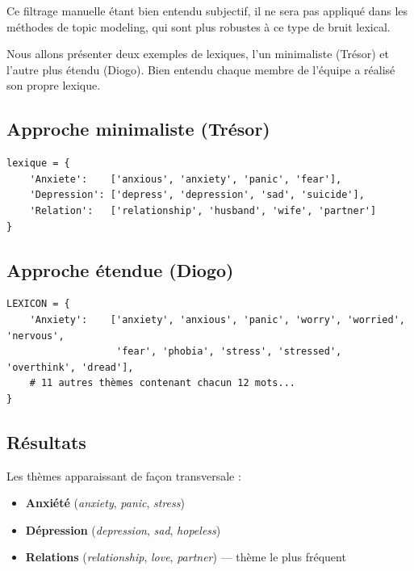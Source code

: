 \documentclass[12pt,a4paper]{report}
\begin{document}
\begin{note}[Remarque]
  Ce filtrage manuelle étant bien entendu subjectif, il ne sera pas appliqué dans les méthodes de topic modeling, qui sont plus robustes à ce type de bruit lexical.
\end{note}

Nous allons présenter deux exemples de lexiques, l'un minimaliste (Trésor) et l'autre plus étendu (Diogo). 
Bien entendu chaque membre de l'équipe a réalisé son propre lexique.

\subsection{Approche minimaliste (Trésor)}

\begin{lstlisting}
lexique = {
    'Anxiete':    ['anxious', 'anxiety', 'panic', 'fear'],
    'Depression': ['depress', 'depression', 'sad', 'suicide'],
    'Relation':   ['relationship', 'husband', 'wife', 'partner']
}
\end{lstlisting}

\subsection{Approche étendue (Diogo)}

\begin{lstlisting}
LEXICON = {
    'Anxiety':    ['anxiety', 'anxious', 'panic', 'worry', 'worried', 'nervous',
                   'fear', 'phobia', 'stress', 'stressed', 'overthink', 'dread'],
    # 11 autres thèmes contenant chacun 12 mots...
}
\end{lstlisting}

\pagebreak

\subsection{Résultats}

Les thèmes apparaissant de façon transversale :
\begin{itemize}
  \item \textbf{Anxiété} (\textit{anxiety}, \textit{panic}, \textit{stress})
  \item \textbf{Dépression} (\textit{depression}, \textit{sad}, \textit{hopeless})
  \item \textbf{Relations} (\textit{relationship}, \textit{love}, \textit{partner}) — thème le plus fréquent
\end{itemize}
\end{document}
